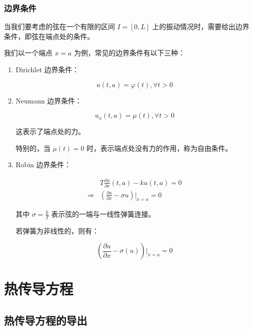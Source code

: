\documentclass{beamer}
\begin{document}
\begin{frame}[allowframebreaks]
	\frametitle{边界条件}
	当我们要考虑的弦在一个有限的区间 $I=[0,L]$ 上的振动情况时，需要给出边界条件，即弦在端点处的条件。\newline

	我们以一个端点 $x=a$ 为例，常见的边界条件有以下三种：

	\begin{enumerate}
		\item Dirichlet 边界条件：

		      $$
			      u(t,a)=\varphi(t),\forall t> 0
		      $$
		\item Neumann 边界条件：

		      $$
			      u_x(t,a)=\mu(t),\forall t> 0
		      $$

		      这表示了端点处的力。\newline

		      特别的，当 $\mu(t)= 0$ 时，表示端点处没有力的作用，称为自由条件。

		\item Robin 边界条件：

		      $$
			      \begin{aligned}
				                  & T\frac{\partial u}{\partial x}(t,a)-ku(t,a)=0                \\
				      \Rightarrow & \left(\frac{\partial u}{\partial x}-\sigma u\right)|_{x=a}=0
			      \end{aligned}
		      $$

		      其中 $\sigma = \frac{k}{T}$ 表示弦的一端与一线性弹簧连接。\newline

		      若弹簧为非线性的，则有：

		      $$
			      \left(\frac{\partial u}{\partial x}-\sigma (u)\right)|_{x=a}=0
		      $$
	\end{enumerate}
\end{frame}


\section{热传导方程}

\subsection{热传导方程的导出}
\end{document}
